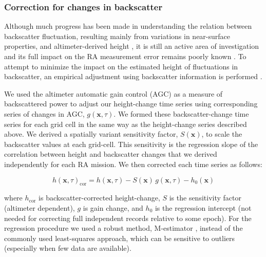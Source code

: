 \subsubsection{Correction for changes in backscatter}
\label{ra-corr}

Although much progress has been made in understanding the relation between backscatter fluctuation, resulting mainly from variations in near-surface properties, and altimeter-derived height \parencite{Arthern2001, Davis1993, Legresy1998, Partington1989, Remy2012, Ridley1988}, it is still an active area of investigation and its full impact on the RA measurement error remains poorly known \parencite{Remy2012}. To attempt to minimize the impact on the estimated height of fluctuations in backscatter, an empirical adjustment using backscatter information is performed \parencite{Davis2004, Khvorostovsky2012, Remy2009, Wingham2006, Wingham1998, Zwally2005}.

We used the altimeter automatic gain control (AGC) as a measure of backscattered power to adjust our height-change time series using corresponding series of changes in AGC, $g(\mathbf x,\tau)$. We formed these backscatter-change time series for each grid cell in the same way as the height-change series described above. We derived a spatially variant sensitivity factor, $S(\mathbf x)$, to scale the backscatter values at each grid-cell. This sensitivity is the regression slope of the correlation between height and backscatter changes that we derived independently for each RA mission. We then corrected each time series as follows:

\begin{equation}
  h(\mathbf x,\tau)_\text{cor} = h(\mathbf x,\tau) 
    - S(\mathbf x) \, g(\mathbf x,\tau) - h_0(\mathbf x)
  \label{c2e4}
\end{equation}

\noindent
where $h_\text{cor}$ is backscatter-corrected height-change, $S$ is the sensitivity factor (altimeter dependent), $g$ is gain change, and $h_0$ is the regression intercept (not needed for correcting full independent records relative to some epoch). For the regression procedure we used a robust method, M-estimator \parencite{Huber1981}, instead of the commonly used least-squares approach, which can be sensitive to outliers (especially when few data are available).

